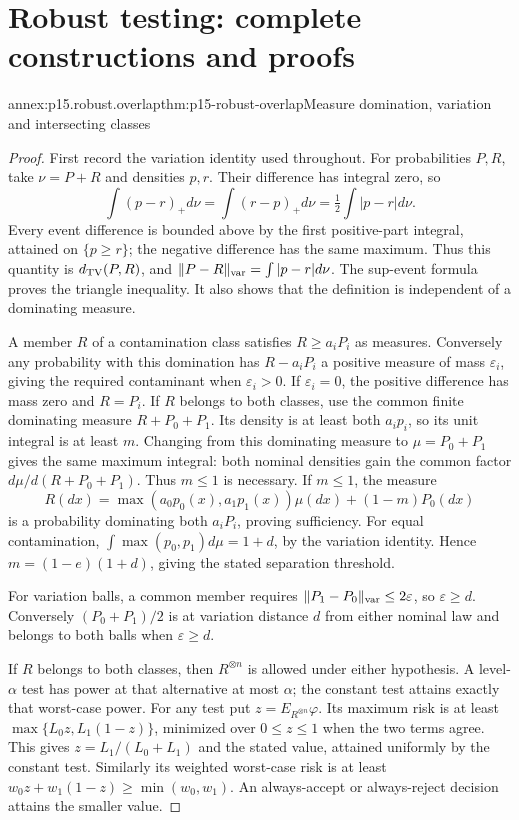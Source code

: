 \section{Robust testing: complete constructions and proofs}
\label{sec:annex-p15-robust-hypothesis-testing}

\begin{annexitem}{annex:p15.robust.overlap}{thm:p15-robust-overlap}{Measure domination, variation and intersecting classes}
\begin{proof}
First record the variation identity used throughout. For probabilities
\(P,R\), take \(\nu=P+R\) and densities \(p,r\). Their difference
has integral zero, so
\[
 \int(p-r)_+d\nu=\int(r-p)_+d\nu
 =\tfrac12\int|p-r|d\nu.
\]
Every event difference is bounded above by the first positive-part
integral, attained on \(\{p\geq r\}\); the negative difference has the
same maximum. Thus this quantity is \(d_{\rm TV}(P,R)\), and
\(\|P-R\|_{\rm var}=\int|p-r|d\nu\).
The sup-event formula proves the triangle inequality. It also shows
that the definition is independent of a dominating measure.

A member \(R\) of a contamination class satisfies \(R\geq a_iP_i\)
as measures. Conversely any probability with this domination has
\(R-a_iP_i\) a positive measure of mass \(\varepsilon_i\), giving
the required contaminant when \(\varepsilon_i>0\). If \(\varepsilon_i=0\),
the positive difference has mass zero and \(R=P_i\).
If \(R\) belongs to both classes, use the common finite dominating
measure \(R+P_0+P_1\). Its density is at least both \(a_ip_i\), so its
unit integral is at least \(m\). Changing from this dominating measure
to \(\mu=P_0+P_1\) gives the same maximum integral: both nominal
densities gain the common factor \(d\mu/d(R+P_0+P_1)\).
Thus \(m\leq1\) is necessary.
If \(m\leq1\), the measure
\[
 R(dx)=\max(a_0p_0(x),a_1p_1(x))\mu(dx)+(1-m)P_0(dx)
\]
is a probability dominating both \(a_iP_i\), proving sufficiency.
For equal contamination,
\(\int\max(p_0,p_1)d\mu=1+d\), by the variation identity.
Hence \(m=(1-e)(1+d)\), giving the stated separation threshold.

For variation balls, a common member requires
\(\|P_1-P_0\|_{\rm var}\leq2\varepsilon\), so \(\varepsilon\geq d\).
Conversely \((P_0+P_1)/2\) is at variation distance \(d\) from either
nominal law and belongs to both balls when \(\varepsilon\geq d\).

If \(R\) belongs to both classes, then \(R^{\otimes n}\) is allowed
under either hypothesis. A level-\(\alpha\) test has power at that
alternative at most \(\alpha\); the constant test attains exactly that
worst-case power. For any test put \(z=E_{R^{\otimes n}}\varphi\).
Its maximum risk is at least
\(\max\{L_0z,L_1(1-z)\}\), minimized over \(0\leq z\leq1\) when
the two terms agree. This gives \(z=L_1/(L_0+L_1)\) and the stated
value, attained uniformly by the constant test.
Similarly its weighted worst-case risk is at least
\(w_0z+w_1(1-z)\geq\min(w_0,w_1)\).
An always-accept or always-reject decision attains the smaller value.
\end{proof}
\end{annexitem}

